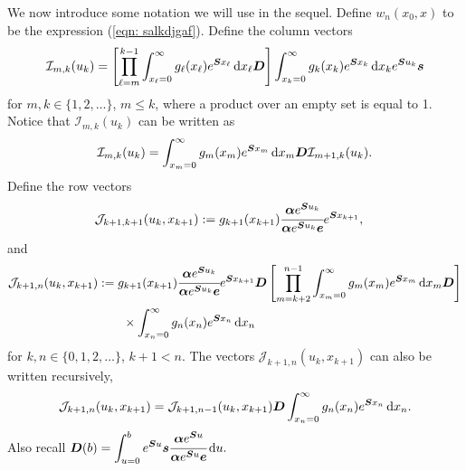 We now introduce some notation we will use in the sequel. Define \(w_n(x_0,x)\) to be the expression (\ref{eqn: salkdjgaf}). Define the column vectors 
\begin{align}
	\mathcal I_{m,k}(u_k) = \left[\prod_{\ell=m}^{k-1}\int_{x_\ell=0}^\infty g_\ell(x_\ell) e^{\boldsymbol{S}x_\ell}\, \mathrm{d} x_\ell \boldsymbol{D} \right]
            	\int_{x_k=0}^\infty g_{k}(x_k) e^{\boldsymbol{S}x_k} \, \mathrm{d} x_k e^{\boldsymbol{S}u_k}\boldsymbol s
\end{align}
for \(m,k\in\{1,2,\dots\}\), \(m\leq k\), where a product over an empty set is equal to 1. Notice that \(\mathcal I_{m,k}(u_k)\) can be written as 
\begin{align}
	\mathcal I_{m,k}(u_k) = \int_{x_m=0}^\infty g_m(x_m)e^{\boldsymbol Sx_m} \, \mathrm{d} x_m \boldsymbol D \mathcal I_{m+1,k}(u_k). \label{eqn: I recursive} 
\end{align}
Define the row vectors 
\begin{align}
	\mathcal J_{k+1,k+1}(u_k,x_{k+1}) &:= g_{k+1}(x_{k+1})\cfrac{\boldsymbol \alpha e^{\boldsymbol{S}u_{k}}}{\boldsymbol \alpha e^{\boldsymbol{S}u_{k}}\boldsymbol e}e^{\boldsymbol{S}x_{k+1}},
\end{align}
and
\begin{align}
	\mathcal J_{k+1,n}(u_k,x_{k+1}) &:= g_{k+1}(x_{k+1})\cfrac{\boldsymbol \alpha e^{\boldsymbol{S}u_{k}}}{\boldsymbol \alpha e^{\boldsymbol{S}u_{k}}\boldsymbol e} e^{\boldsymbol{S}x_{k+1}} \boldsymbol{D} \left[\prod_{m=k+2}^{n-1}\int_{x_{m}=0}^\infty g_{m}(x_{m}) e^{\boldsymbol{S}x_{m}} \, \mathrm{d} x_{m} \boldsymbol{D} \right]\nonumber
            	\\&\qquad\times\int_{x_n=0}^\infty g_{n}(x_n) e^{\boldsymbol{S}x_n} \, \mathrm{d} x_n
\end{align}
for \(k,n\in\{0,1,2,\dots\}\), \(k+1<n\). The vectors \(\mathcal J_{k+1,n}(u_k,x_{k+1})\) can also be written recursively, 
\begin{align}
	\mathcal J_{k+1,n}(u_k,x_{k+1}) = \mathcal J_{k+1,n-1}(u_k,x_{k+1})\boldsymbol D \int_{x_n=0}^\infty g_n(x_n)e^{\boldsymbol Sx_n}\, \mathrm{d} x_n.\label{eqn: J recursive} 
\end{align}
Also recall \(\displaystyle\boldsymbol D(b) = \int_{u=0}^be^{\boldsymbol Su}\boldsymbol s \cfrac{\boldsymbol\alpha e^{\boldsymbol S u}}{\boldsymbol \alpha e^{\boldsymbol S u}\boldsymbol e} \, \mathrm{d} u.\)

